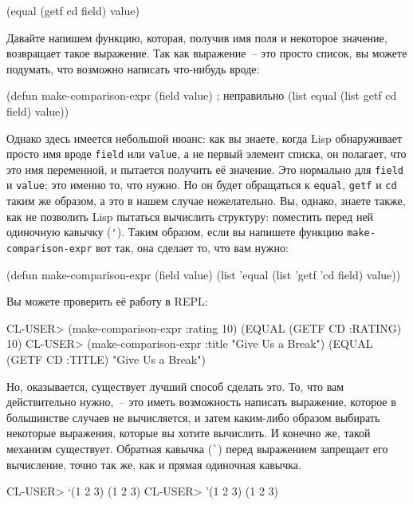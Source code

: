 \begin{myverb}
(equal (getf cd field) value)
\end{myverb}

Давайте напишем функцию, которая, получив имя поля и некоторое значение, возвращает такое
выражение. Так как выражение~-- это просто список, вы можете подумать, что возможно
написать что-нибудь вроде:

\begin{myverb}
(defun make-comparison-expr (field value)    ; неправильно
  (list equal (list getf cd field) value))
\end{myverb}

Однако здесь имеется небольшой нюанс: как вы знаете, когда Lisp обнаруживает просто имя
вроде \lstinline{field} или \lstinline{value}, а не первый элемент списка, он полагает, что это имя
переменной, и пытается получить её значение. Это нормально для \lstinline{field} и
\lstinline{value}; это именно то, что нужно. Но он будет обращаться к \lstinline{equal}, \lstinline{getf}
и \lstinline{cd} таким же образом, а это в нашем случае нежелательно. Вы, однако, знаете также,
как не позволить Lisp пытаться вычислить структуру: поместить перед ней одиночную кавычку
(\lstinline{'}). Таким образом, если вы напишете функцию \lstinline{make-comparison-expr} вот так,
она сделает то, что вам нужно:

\begin{myverb}
(defun make-comparison-expr (field value)
  (list 'equal (list 'getf 'cd field) value))
\end{myverb}

Вы можете проверить её работу в REPL:

\begin{myverb}
CL-USER> (make-comparison-expr :rating 10)
(EQUAL (GETF CD :RATING) 10)
CL-USER> (make-comparison-expr :title "Give Us a Break")
(EQUAL (GETF CD :TITLE) "Give Us a Break")
\end{myverb}

Но, оказывается, существует лучший способ сделать это. То, что вам действительно нужно,~--
это иметь возможность написать выражение, которое в большинстве случаев не вычисляется, и
затем каким-либо образом выбирать некоторые выражения, которые вы хотите вычислить. И
конечно же, такой механизм существует. Обратная кавычка (\lstinline{`}) перед выражением
запрещает его вычисление, точно так же, как и прямая одиночная кавычка.

\begin{myverb}
CL-USER> `(1 2 3)
(1 2 3)
CL-USER> '(1 2 3)
(1 2 3)
\end{myverb}

